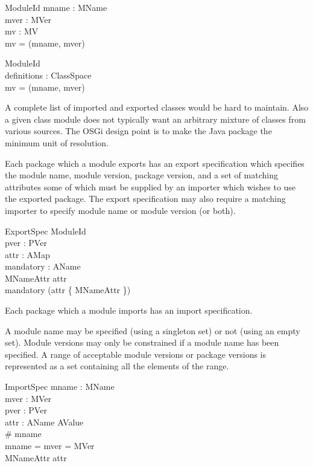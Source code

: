 \documentclass[a4paper,9pt]{article}
\begin{document}
\begin{schema}{ModuleId}
  mname : MName \\
  mver : MVer \\
  mv : MV \\
\where
  mv = (mname, mver)
\end{schema}

\begin{schema}{\ModuleDefZero}
  ModuleId \\
  definitions : ClassSpace \\
\where
  mv = (mname, mver)
\end{schema}

A complete list of imported and exported classes would be hard to maintain.
Also a given class module does not typically want an arbitrary mixture of
classes from various sources.
The OSGi design point is to make the Java package the minimum unit of
resolution.

Each package which a module exports has an export specification which
specifies the module  name, module version, package version, and
a set of matching attributes some of which must be supplied by an importer
which wishes to use the exported package.
The export specification may also require a matching importer to specify
module  name or module version (or both).
\begin{schema}{ExportSpec}
  ModuleId \\
  pver : PVer \\
  attr : AMap \\
  mandatory : \power AName \\
\where
  MNameAttr \notin \dom attr \\
  mandatory \subseteq (\dom attr \cup \{ MNameAttr \}) \\
\end{schema}

Each package which a module imports has an import specification.

A module name may be specified (using a singleton set) or not (using an empty set).
Module versions may only be constrained if a module name has been specified.
A range of acceptable module versions or package versions is represented as a set containing
all the elements of the range.
\begin{schema}{ImportSpec}
  mname : \power MName \\
  mver : \power MVer \\
  pver : \power PVer \\
  attr : AName \pfun AValue \\
\where
  \# mname  \\
  mname = \empty \implies mver = MVer \\
  MNameAttr \notin \dom attr \\
\end{schema}
\end{document}
